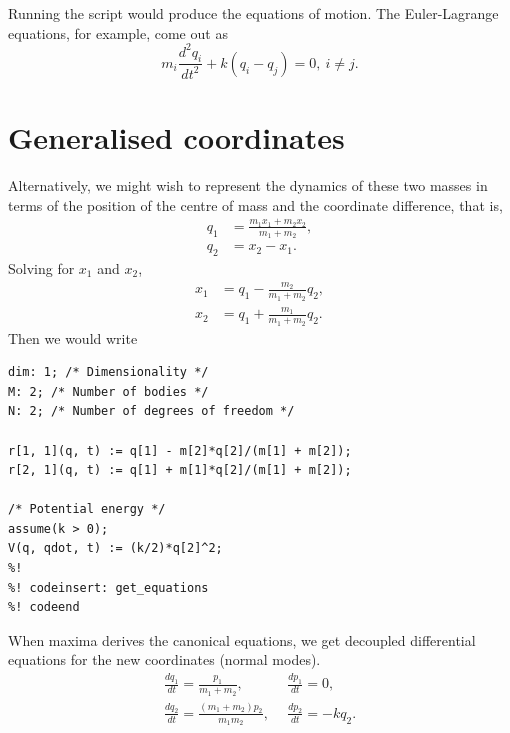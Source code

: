\documentclass{article}
\begin{document}
Running the script would produce the equations of motion. The Euler-Lagrange
equations, for example, come out as
\begin{equation*}
  m_i \frac{d^2 q_i}{dt^2} + k(q_i - q_j) = 0,\ i \neq j.
\end{equation*}

\section{Generalised coordinates}

Alternatively, we might wish to represent the dynamics of these two masses in
terms of the position of the centre of mass and the coordinate difference,
that is,
\begin{align*}
  q_1 & = \frac{m_1 x_1 + m_2 x_2}{m_1 + m_2}, \\
  q_2 & = x_2 - x_1.
\end{align*}
Solving for $x_1$ and $x_2$,
\begin{align*}
  x_1 & = q_1 - \frac{m_2}{m_1 + m_2} q_2, \\
  x_2 & = q_1 + \frac{m_1}{m_1 + m_2} q_2.
\end{align*}
Then we would write
\begin{lstlisting}[frame=single]
%! codefile: normal_modes.mc
dim: 1; /* Dimensionality */
M: 2; /* Number of bodies */
N: 2; /* Number of degrees of freedom */

r[1, 1](q, t) := q[1] - m[2]*q[2]/(m[1] + m[2]);
r[2, 1](q, t) := q[1] + m[1]*q[2]/(m[1] + m[2]);

/* Potential energy */
assume(k > 0);
V(q, qdot, t) := (k/2)*q[2]^2;
%!
%! codeinsert: get_equations
%! codeend
\end{lstlisting}
When maxima derives the canonical equations, we get decoupled differential
equations for the new coordinates (normal modes).
\begin{align*}
  \frac{dq_1}{dt} = \frac{p_1}{m_1 + m_2},\  &
  \ \frac{dp_1}{dt} = 0, \\
  \frac{dq_2}{dt} = \frac{(m_1 + m_2) p_2}{m_1 m_2},\  &
  \ \frac{dp_2}{dt} = -k q_2.
\end{align*}
\end{document}
